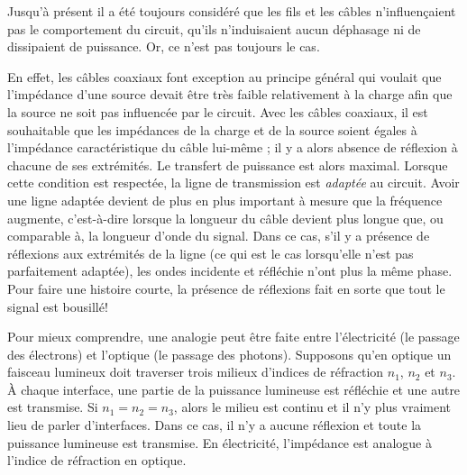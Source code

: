 \documentclass[12pt,oneside,letterpaper]{article}
\begin{document}
Jusqu'à présent il a été toujours considéré que les fils et les câbles n'influençaient pas le comportement du circuit, qu'ils n'induisaient aucun déphasage ni de dissipaient de puissance. Or, ce n'est pas toujours le cas.

En effet, les câbles coaxiaux font exception au principe général qui voulait que l'impédance d'une source devait être très faible relativement à la charge afin que la source ne soit pas influencée par le circuit. Avec les câbles coaxiaux, il est souhaitable que les impédances de la charge et de la source soient égales à l'impédance caractéristique du câble lui-même ; il y a alors absence de réflexion à chacune de ses extrémités. Le transfert de puissance est alors maximal. Lorsque cette condition est respectée, la ligne de transmission est \textit{adaptée} au circuit. Avoir une ligne adaptée devient de plus en plus important à mesure que la fréquence augmente, c'est-à-dire lorsque la longueur du câble devient plus longue que, ou comparable à, la longueur d'onde du signal. Dans ce cas, s'il y a présence de réflexions aux extrémités de la ligne (ce qui est le cas lorsqu'elle n'est pas parfaitement adaptée), les ondes incidente et réfléchie n'ont plus la même phase. Pour faire une histoire courte, la présence de réflexions fait en sorte que tout le signal est bousillé!

Pour mieux comprendre, une analogie peut être faite entre l'électricité (le passage des électrons) et l'optique (le passage des photons). Supposons qu'en optique un faisceau lumineux doit traverser trois milieux d'indices de réfraction $n_1$, $n_2$ et $n_3$. À chaque interface, une partie de la puissance lumineuse est réfléchie et une autre est transmise. Si $n_1=n_2=n_3$, alors le milieu est continu et il n'y plus vraiment lieu de parler d'interfaces. Dans ce cas, il n'y a aucune réflexion et toute la puissance lumineuse est transmise. En électricité, l'impédance est analogue à l'indice de réfraction en optique.
\end{document}
